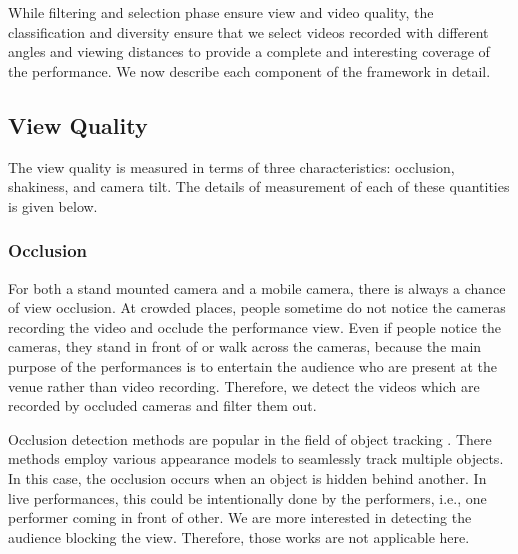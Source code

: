 \documentclass{sig-alternate}
\begin{document}
While filtering and selection phase ensure view and video quality, the classification and diversity ensure that we select videos recorded with different angles and viewing distances to provide a complete and interesting coverage of the performance. We now describe each component of the framework in detail.

\subsection{View Quality}
The view quality is measured in terms of three characteristics: occlusion, shakiness, and camera tilt. The details of measurement of each of these quantities is given below. 
\subsubsection{Occlusion}
For both a stand mounted camera and a mobile camera, there is always a chance of view occlusion. At crowded places, people sometime do not notice the cameras recording the video and occlude the performance view. Even if people notice the cameras, they stand in front of or walk across the cameras, because the main purpose of the performances is to entertain the audience who are present at the venue rather than video recording. Therefore, we detect the videos which are recorded by occluded cameras and ﬁlter them out.

Occlusion detection methods are popular in the field of object tracking \cite{frakes1992information}. There methods employ various appearance models to seamlessly track multiple objects. In this case, the occlusion occurs when an object is hidden behind another. In live performances, this could be intentionally done by the performers, i.e., one performer coming in front of other. We are more interested in detecting the audience blocking the view. Therefore, those works are not applicable here.
\end{document}
